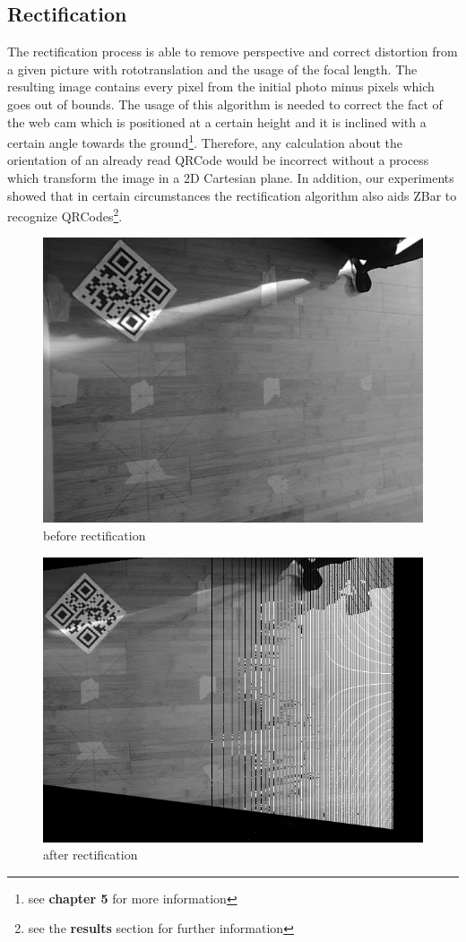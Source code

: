 \subsection{Rectification}
The rectification process is able to remove perspective and correct distortion from a given picture with rototranslation and the usage of the focal length. The resulting image contains every pixel from the initial photo minus pixels which goes out of bounds. The usage of this algorithm is needed to correct the fact of the web cam which is positioned at a certain height and it is inclined with a certain angle towards the ground\footnote{see \textbf{chapter 5} for more information}. Therefore, any calculation about the orientation of an already read QRCode would be incorrect without a process which transform the image in a 2D Cartesian plane. In addition, our experiments showed that in certain circumstances the rectification algorithm also aids ZBar to recognize QRCodes\footnote{see the \textbf{results} section for further information}. 
\vspace{1.25cm}
\begin{figure}[hbt]
    \centering
    \includegraphics[scale=0.3]{img/beforerect.png}
    \caption{before rectification}
\end{figure}
\begin{figure}[hbt]
    \centering
    \includegraphics[scale=0.3]{img/afterrect.png}
    \caption{after rectification}
\end{figure}




 

